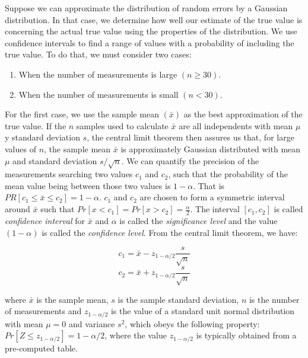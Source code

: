 Suppose we can approximate the distribution of random errors by a Gaussian
distribution. In that case, we determine how well our estimate of the true value is concerning the actual true value using the properties of the distribution. We use
confidence intervals to find a range of values with a probability
of including the true value. To do that, we must consider two cases:

\begin{enumerate}
\item When the number of measurements is large \((n \ge 30)\).
\item When the number of measurements is small \((n < 30)\).
\end{enumerate}

For the first case, we use the sample mean \((\bar{x})\) as the best
approximation of the true value. If the \(n\) samples used to calculate
\(\bar{x}\) are all independents with mean \(\mu\) y standard deviation
\(s\), the central limit theorem then assures us that, for large values of
\(n\), the sample mean \(\bar{x}\) is approximately Gaussian distributed with
mean \(\mu\) and standard deviation \(s / \sqrt{n}\). We can quantify the
precision of the measurements searching two values \(c_1\) and \(c_2\), such
that the probability of the mean value being between those two values is \(1 -
   \alpha\). That is \(PR[c_1 \le \bar{x} \le c_2] = 1 - \alpha\). \(c_1\) and
\(c_2\) are chosen to form a symmetric interval around \(\bar{x}\) such that
\(Pr[x < c_1] = Pr[x > c_2] = \frac{\alpha}{2}\). The interval \([c_1, c_2]\)
is called \textit{confidence interval} for \(\bar{x}\) and \(\alpha\) is
called the \textit{significance level} and the value \((1 - \alpha)\) is
called the \textit{confidence level}. From the central limit theorem, we
have:

\begin{equation}
c_1 = \bar{x} - z_{1 - \alpha/2}\frac{s}{\sqrt{n}}
\end{equation}
\begin{equation}
c_2 = \bar{x} + z_{1 - \alpha/2}\frac{s}{\sqrt{n}}
\end{equation}

where \(\bar{x}\) is the sample mean, \(s\) is the sample standard deviation,
\(n\) is the number of measurements and \(z_{1 - \alpha/2}\) is the value of
a standard unit normal distribution with mean \(\mu = 0\) and variance
\(s^2\), which obeys the following property: \(Pr[Z \le z_{1-\alpha/2}] =
   1 - \alpha/2\), where the value \(z_{1 - \alpha/2}\) is typically obtained
from a pre-computed table.

